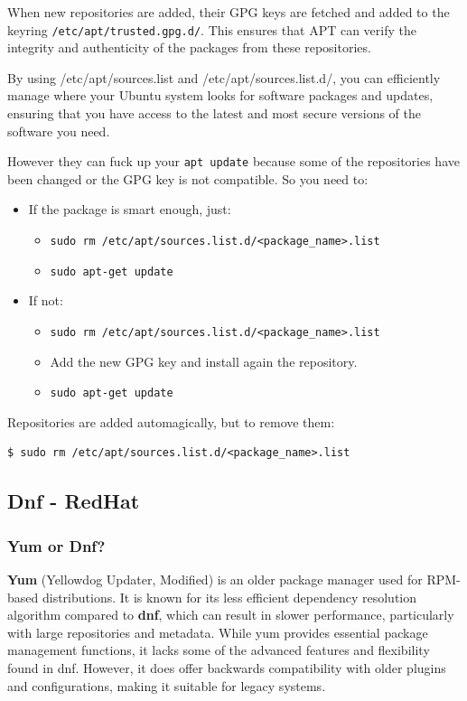 \documentclass{article}
\newenvironment{blocktemplateIII}[1]{%
    \tcolorbox[beamer,%
    noparskip,breakable,
    ,colframe=Red,%
    colbacklower=LimeGreen!75!LightGreen,%
    title=#1]}%
    {\endtcolorbox}
\newenvironment{codetemplate}[1][]{%
  \mybasecolorbox[#1]
  \itshape
}{%
  \endmybasecolorbox
}
\begin{document}
When new repositories are added,  their GPG keys are fetched and added to the keyring \verb|/etc/apt/trusted.gpg.d/|. This ensures that APT can verify the integrity and authenticity of the packages from these repositories. 

By using /etc/apt/sources.list and /etc/apt/sources.list.d/, you can efficiently manage where your Ubuntu system looks for software packages and updates, ensuring that you have access to the latest and most secure versions of the software you need.

\begin{blocktemplateIII}{Warning}
However they can fuck up your \verb|apt update| because some of the repositories have been changed or the GPG key is not compatible. So you need to:
\begin{itemize}
    \item If the package is smart enough, just:
    \begin{itemize}
        \item \verb|sudo rm /etc/apt/sources.list.d/<package_name>.list|
        \item \verb|sudo apt-get update|
    \end{itemize}

    \item If not:
    \begin{itemize}
        \item \verb|sudo rm /etc/apt/sources.list.d/<package_name>.list|
        \item Add the new GPG key and install again the repository.
        \item \verb|sudo apt-get update|
    \end{itemize}
\end{itemize} 
\end{blocktemplateIII}

Repositories are added automagically, but to remove them:
\begin{codetemplate}
\begin{verbatim}
$ sudo rm /etc/apt/sources.list.d/<package_name>.list
\end{verbatim}
\end{codetemplate}

\subsection{Dnf - RedHat}

\subsubsection{Yum or Dnf?}
\textbf{Yum} (Yellowdog Updater, Modified) is an older package manager used for RPM-based distributions. It is known for its less efficient dependency resolution algorithm compared to \textbf{dnf}, which can result in slower performance, particularly with large repositories and metadata. While yum provides essential package management functions, it lacks some of the advanced features and flexibility found in dnf. However, it does offer backwards compatibility with older plugins and configurations, making it suitable for legacy systems.
\end{document}
